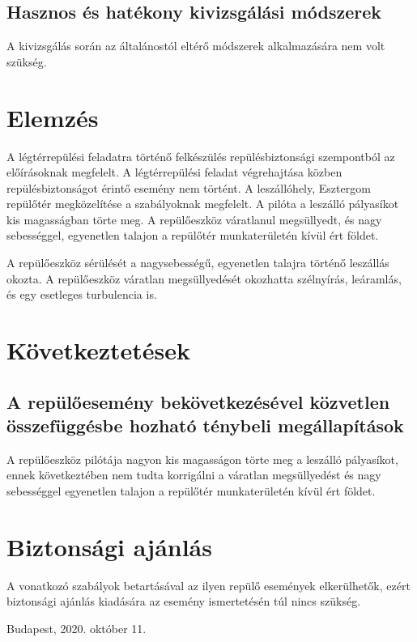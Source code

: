 \documentclass[a4paper,10pt]{article}
\begin{document}
\subsection{Hasznos és hatékony kivizsgálási módszerek}
A kivizsgálás során az általánostól eltérő módszerek alkalmazására nem volt 
szükség.

\section{Elemzés}
A légtérrepülési feladatra történő felkészülés repülésbiztonsági
szempontból az előírásoknak megfelelt. A légtérrepülési feladat
végrehajtása közben repülésbiztonságot érintő esemény nem történt. A 
leszállóhely, Esztergom repülőtér megközelítése a szabályoknak megfelelt. A 
pilóta a leszálló pályasíkot kis magasságban törte meg. A repülőeszköz 
váratlanul megsüllyedt, és nagy sebességgel, egyenetlen talajon a repülőtér 
munkaterületén kívül ért földet.

A repülőeszköz sérülését a nagysebességű, egyenetlen talajra történő 
leszállás okozta. A repülőeszköz váratlan megsüllyedését okozhatta
szélnyírás, leáramlás, és egy esetleges turbulencia is.

\section{Következtetések}
\subsection{A repülőesemény bekövetkezésével közvetlen összefüggésbe
hozható ténybeli megállapítások}
A repülőeszköz pilótája nagyon kis magasságon törte meg a leszálló
pályasíkot, ennek következtében nem tudta korrigálni a váratlan
megsüllyedést és nagy sebességgel egyenetlen talajon a repülőtér
munkaterületén kívül ért földet.

\section{Biztonsági ajánlás}
A vonatkozó szabályok betartásával az ilyen repülő események elkerülhetők, 
ezért biztonsági ajánlás kiadására az esemény ismertetésén túl nincs 
szükség.

\vspace{2cm}

Budapest, 2020. október 11.

\vspace{2cm}
\end{document}
